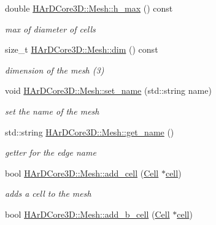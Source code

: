 \begin{DoxyCompactItemize}
double \hyperlink{group__Mesh_gadb86f1eadf808e15e90881d626b467c0}{H\+Ar\+D\+Core3\+D\+::\+Mesh\+::h\+\_\+max} () const
\begin{DoxyCompactList}\small\item\em max of diameter of cells \end{DoxyCompactList}\item 
\mbox{\label{group__Mesh_ga4f3bd8e8670711d830a7cde341808dd1}} 
size\+\_\+t \hyperlink{group__Mesh_ga4f3bd8e8670711d830a7cde341808dd1}{H\+Ar\+D\+Core3\+D\+::\+Mesh\+::dim} () const
\begin{DoxyCompactList}\small\item\em dimension of the mesh (3) \end{DoxyCompactList}\item 
\mbox{\label{group__Mesh_ga694cc6fe11d3640859f7f2c23c8acd44}} 
void \hyperlink{group__Mesh_ga694cc6fe11d3640859f7f2c23c8acd44}{H\+Ar\+D\+Core3\+D\+::\+Mesh\+::set\+\_\+name} (std\+::string name)
\begin{DoxyCompactList}\small\item\em set the name of the mesh \end{DoxyCompactList}\item 
\mbox{\label{group__Mesh_ga2140b63286e05a457a914ca1a1455c2a}} 
std\+::string \hyperlink{group__Mesh_ga2140b63286e05a457a914ca1a1455c2a}{H\+Ar\+D\+Core3\+D\+::\+Mesh\+::get\+\_\+name} ()
\begin{DoxyCompactList}\small\item\em getter for the edge name \end{DoxyCompactList}\item 
\mbox{\label{group__Mesh_gab58e51275f4fd83e36fdf8aba6ee846d}} 
bool \hyperlink{group__Mesh_gab58e51275f4fd83e36fdf8aba6ee846d}{H\+Ar\+D\+Core3\+D\+::\+Mesh\+::add\+\_\+cell} (\hyperlink{classHArDCore3D_1_1Cell}{Cell} $\ast$\hyperlink{classHArDCore3D_1_1Mesh_ae07b938c57cf57e3bb9c76d3df1eb549}{cell})
\begin{DoxyCompactList}\small\item\em adds a cell to the mesh \end{DoxyCompactList}\item 
\mbox{\label{group__Mesh_ga31f05cf2b4cbb3dd729e99f96345dbbe}} 
bool \hyperlink{group__Mesh_ga31f05cf2b4cbb3dd729e99f96345dbbe}{H\+Ar\+D\+Core3\+D\+::\+Mesh\+::add\+\_\+b\+\_\+cell} (\hyperlink{classHArDCore3D_1_1Cell}{Cell} $\ast$\hyperlink{classHArDCore3D_1_1Mesh_ae07b938c57cf57e3bb9c76d3df1eb549}{cell})

\end{DoxyCompactItemize}
